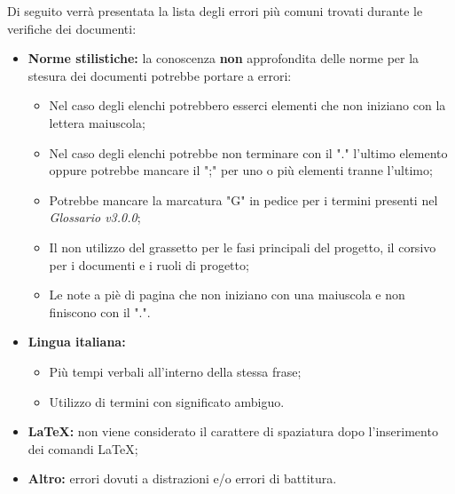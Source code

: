 Di seguito verrà presentata la lista degli errori più comuni trovati durante le verifiche dei documenti:
\begin{itemize}
	\item \textbf{Norme stilistiche:} la conoscenza \textbf{non} approfondita delle norme per la stesura dei documenti potrebbe portare a errori:
		\begin{itemize}
			\item Nel caso degli elenchi potrebbero esserci elementi che non iniziano con la lettera maiuscola;
			\item Nel caso degli elenchi potrebbe non terminare con il "." l'ultimo elemento oppure potrebbe mancare il ";" per uno o più elementi tranne l'ultimo; 
			\item Potrebbe mancare la marcatura "G" in pedice per i termini presenti nel \textit{Glossario v3.0.0};
			\item Il non utilizzo del grassetto per le fasi principali del progetto, il corsivo per i documenti e i ruoli di progetto;
			\item Le note a piè di pagina che non iniziano con una maiuscola e non finiscono con il ".".
		\end{itemize}
	\item \textbf{Lingua italiana:} 
		\begin{itemize}
			\item Più tempi verbali all'interno della stessa frase;
			\item Utilizzo di termini con significato ambiguo.
		\end{itemize}
	\item \textbf{\LaTeX:} non viene considerato il carattere di spaziatura dopo l'inserimento dei  comandi \LaTeX;
	\item \textbf{Altro:} errori dovuti a distrazioni e/o errori di battitura.
\end{itemize}

